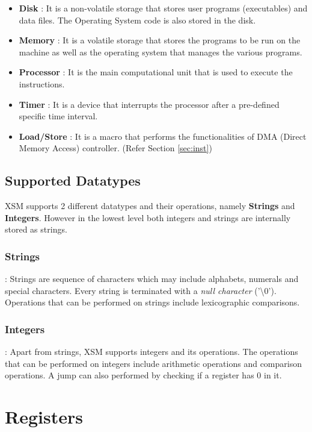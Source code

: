 \documentclass[11pt]{report}
\begin{document}
\begin{itemize}
\item \textbf{Disk} : It is a non-volatile storage that stores user programs (executables) and data files. The Operating System code is also stored in the disk.

\item \textbf{Memory} : It is a volatile storage that stores the programs to be run on the machine as well as the operating system that manages the various programs.
\item \textbf{Processor} : It is the main computational unit that is used to execute the instructions.
\item \textbf{Timer} : It is a device that interrupts the processor after a pre-defined specific time interval.
\item \textbf{Load/Store} : It is a macro that performs the functionalities of DMA (Direct Memory Access) controller. (Refer Section \ref{sec:inst})
\end{itemize}


\section{Supported Datatypes}

XSM supports 2 different datatypes and their operations, namely \textbf{Strings} and \textbf{Integers}. However in the lowest level both integers and strings are internally stored as strings.

\subsection{Strings}: Strings are sequence of characters which may include alphabets, numerals and special characters. Every string is terminated with a \textit{null character} (’\textbackslash 0’). Operations that can be performed on strings include lexicographic comparisons.


\subsection{Integers}: Apart from strings, XSM supports integers and its operations. The operations that can be performed on integers include arithmetic operations and comparison operations. A jump can also performed by checking if a register has 0 in it.



\chapter{Registers}
\end{document}
